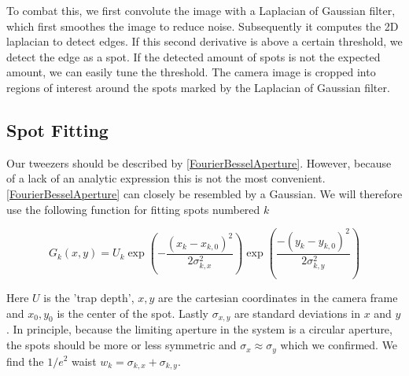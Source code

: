 To combat this, we first convolute the image with a Laplacian of Gaussian filter, which first smoothes the image to reduce noise. Subsequently it computes the 2D laplacian to detect edges. If this second derivative is above a certain threshold, we detect the edge as a spot. If the detected amount of spots is not the expected amount, we can easily tune the threshold. The camera image is cropped into regions of interest around the spots marked by the Laplacian of Gaussian filter. 

\subsection{Spot Fitting}

Our tweezers should be described by \cref{FourierBesselAperture}. However, because of a lack of an analytic expression this is not the most convenient. \cref{FourierBesselAperture} can closely be resembled by a Gaussian. We will therefore use the following function for fitting spots numbered $k$

\begin{equation}\label{2DGaussian}
    G_k(x,y) = U_k \exp{\left(-\frac{(x_k-x_{k,0})^2}{2\sigma_{k,x}^2}\right)}
    \exp{\left( \frac{-(y_k-y_{k,0})^2}{2\sigma_{k,y}^2} \right)}
\end{equation}

Here $U$ is the 'trap depth', $x,y$ are the cartesian coordinates in the camera frame and $x_0,y_0$ is the center of the spot. Lastly $\sigma_{x,y}$ are standard deviations in $x$ and $y$. In principle, because the limiting aperture in the system is a circular aperture, the spots should be more or less symmetric and $\sigma_x\approx \sigma_y$ which we confirmed. We find the $1/e^2$ waist $w_k=\sigma_{k,x}+\sigma_{k,y}$. 